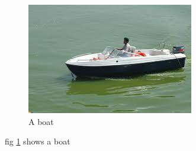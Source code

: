 \documentclass{article}
\begin{document}
 	\begin{figure}
 		\includegraphics[width=\linewidth]{boat.jpg}
 		\caption{A boat}
 		\label{fig:boat1}
 	\end{figure}
 fig \ref{fig:boat1} shows a boat
 
\end{document}
